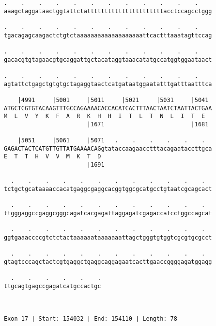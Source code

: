 \documentclass{article}
\begin{document}
\begin{Verbatim}
.    .    .    .    .    .    .    .    .    .    .    .    
aaagctaggataactggtattctattttttttttttttttttttttacctccagcctggg
                                                            
.    .    .    .    .    .    .    .    .    .    .    .    
tgacagagcaagactctgtctaaaaaaaaaaaaaaaaaaattcactttaaatagttccag
                                                            
.    .    .    .    .    .    .    .    .    .    .    .    
gacacgtgtagaacgtgcaggattgctacataggtaaacatatgccatggtggaataact
                                                            
.    .    .    .    .    .    .    .    .    .    .    .    
agtattctgagctgtgtgctagaggtaactcatgataatggaatatttgatttaatttca
                                                            
    |4991     |5001     |5011     |5021     |5031     |5041 
ATGCTCGTGTACAAGTTTGCCAGAAAACACCACATCACTTTAACTAATCTAATTACTGAA
M  L  V  Y  K  F  A  R  K  H  H  I  T  L  T  N  L  I  T  E  
                        |1671                         |1681 
  
    |5051     |5061     |5071   .    .    .    .    .    .  
GAGACTACTCATGTTGTTATGAAAACAGgtataccaagaacctttacagaataccttgca
E  T  T  H  V  V  M  K  T  D                                
                        |1691                               
  
  .    .    .    .    .    .    .    .    .    .    .    .  
tctgctgcataaaaccacatgaggcgaggcacggtggcgcatgcctgtaatcgcagcact
                                                            
  .    .    .    .    .    .    .    .    .    .    .    .  
ttgggaggccgaggcgggcagatcacgagattaggagatcgagaccatcctggccagcat
                                                            
  .    .    .    .    .    .    .    .    .    .    .    .  
ggtgaaaccccgtctctactaaaaaataaaaaaattagctgggtgtggtcgcgtgcgcct
                                                            
  .    .    .    .    .    .    .    .    .    .    .    .  
gtagtcccagctactcgtgaggctgaggcaggagaatcacttgaaccggggagatggagg
                                                            
  .    .    .    .    .    .
ttgcagtgagccgagatcatgccactgc
                            
                            
 
Exon 17 | Start: 154032 | End: 154110 | Length: 78
 

\end{Verbatim}
\end{document}
